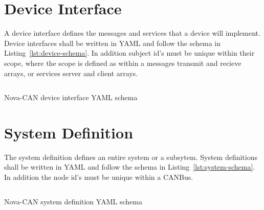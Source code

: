 \documentclass[a4paper,12pt]{article}
\begin{document}
\newpage
\section{Device Interface}
\label{sec:device-interface}
A device interface defines the messages and services that a device will implement. 
Device interfaces shall be written in YAML and follow the schema in Listing~\ref{lst:device-schema}.
In addition subject id's must be unique within their scope, where the scope is defined as within
a messages transmit and recieve arrays, or services server and client arrays.
\begin{listing}[H]
    \inputminted[fontsize=\scriptsize, breaklines, frame=lines]{yaml}{../../schema/device_interface.yaml}
    \caption{Nova-CAN device interface YAML schema}
    \label{lst:device-schema}
\end{listing}
    
\section{System Definition}
\label{sec:system-definition}
The system definition defines an entire system or a subsytem. 
System definitions shall be written in YAML and follow the schema in Listing~\ref{lst:system-schema}.
In addition the node id's must be unique within a CANBus.
\begin{listing}[H]
    \inputminted[fontsize=\scriptsize, breaklines, frame=lines]{yaml}{../../schema/system_definition.yaml}
    \caption{Nova-CAN system definition YAML schema}
    \label{lst:system-schema}
\end{listing}
\end{document}

